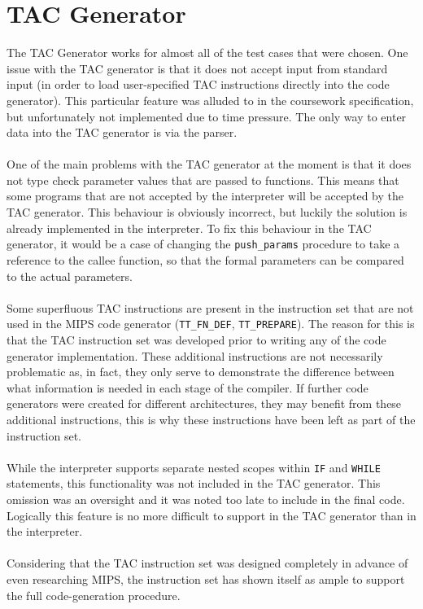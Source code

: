 \section{TAC Generator}
The TAC Generator works for almost all of the test cases that were chosen. One issue with the TAC generator is that it does not accept input from standard input (in order to load user-specified TAC instructions directly into the code generator). This particular feature was alluded to in the coursework specification, but unfortunately not implemented due to time pressure. The only way to enter data into the TAC generator is via the parser. 
\ \\ \ \\
One of the main problems with the TAC generator at the moment is that it does not type check parameter values that are passed to functions. This means that some programs that are not accepted by the interpreter will be accepted by the TAC generator. This behaviour is obviously incorrect, but luckily the solution is already implemented in the interpreter. To fix this behaviour in the TAC generator, it would be a case of changing the \verb!push_params! procedure to take a reference to the callee function, so that the formal parameters can be compared to the actual parameters.
\ \\ \ \\
Some superfluous TAC instructions are present in the instruction set that are not used in the MIPS code generator (\verb!TT_FN_DEF!, \verb!TT_PREPARE!). The reason for this is that the TAC instruction set was developed prior to writing any of the code generator implementation. These additional instructions are not necessarily problematic as, in fact, they only serve to demonstrate the difference between what information is needed in each stage of the compiler. If further code generators were created for different architectures, they may benefit from these additional instructions, this is why these instructions have been left as part of the instruction set.
\ \\ \ \\
While the interpreter supports separate nested scopes within \verb!IF! and \verb!WHILE! statements, this functionality was not included in the TAC generator. This omission was an oversight and it was noted too late to include in the final code. Logically this feature is no more difficult to support in the TAC generator than in the interpreter.
\ \\ \ \\
Considering that the TAC instruction set was designed completely in advance of even researching MIPS, the instruction set has shown itself as ample to support the full code-generation procedure.

